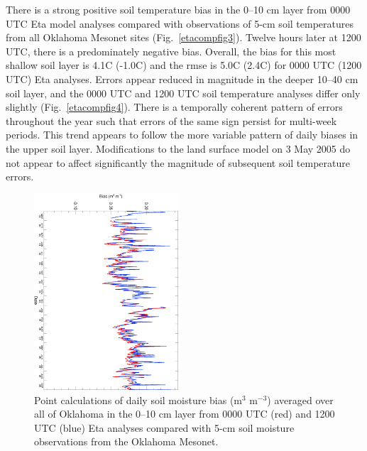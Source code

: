 \documentclass[twocolumn]{article}
\begin{document}
There is a strong positive soil temperature bias in the 0--10 cm layer from 0000 UTC Eta model analyses compared with observations of 5-cm soil temperatures from all Oklahoma Mesonet sites (Fig.~\ref{etacompfig3}).  Twelve hours later at 1200 UTC, there is a predominately negative bias.  Overall, the bias for this most shallow soil layer is 4.1{\textdegree}C (-1.0{\textdegree}C) and the rmse is 5.0{\textdegree}C (2.4{\textdegree}C) for 0000 UTC (1200 UTC) Eta analyses.  Errors appear reduced in magnitude in the deeper 10--40 cm soil layer, and the 0000 UTC and 1200 UTC soil temperature analyses differ only slightly (Fig.~\ref{etacompfig4}).  There is a temporally coherent pattern of errors throughout the year such that errors of the same sign persist for multi-week periods.  This trend appears to follow the more variable pattern of daily biases in the upper soil layer.  Modifications to the land surface model on 3 May 2005 do not appear to affect significantly the magnitude of subsequent soil temperature errors.
\begin{figure}[!t] %
\begin{center}
\includegraphics[angle=90, width=0.48\textwidth]{etacompfig5col}
\end{center}
\caption{
Point calculations of daily soil moisture bias (m$^3$ m$^{-3}$) averaged over all of Oklahoma in the 0--10 cm layer
from 0000 UTC (red) and 1200 UTC (blue) Eta analyses compared with 5-cm
soil moisture observations from the Oklahoma Mesonet.
\label{etacompfig5}
}
\end{figure}
\end{document}
